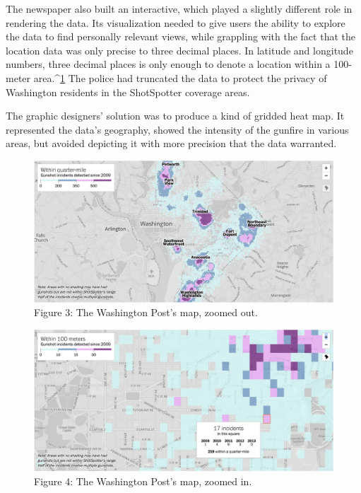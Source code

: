 The newspaper also built an interactive, which played a slightly different
role in rendering the data. Its visualization needed to give users the ability
to explore the data to find personally relevant views, while grappling with
the fact that the location data was only precise to three decimal places. In
latitude and longitude numbers, three decimal places is only enough to
denote a location within a 100-meter area.^{\href{#endnotes-wapo}{1}} The police had truncated the
data to protect the privacy of Washington residents in the ShotSpotter
coverage areas.

The graphic designers' solution was to produce a kind of gridded heat
map. It represented the data's geography, showed the intensity of the gunfire
in various areas, but avoided depicting it with more precision that the
data warranted.

    \begin{figure}
    \includegraphics{images/WaPoMapZoomedOut.png}
    \caption{Figure 3: The Washington Post's map, zoomed out.}
    \end{figure}

    \begin{figure}
    \includegraphics{images/WaPoMapZoomedIn.png}
    \caption{Figure 4: The Washington Post's map, zoomed in.}
    \end{figure}

